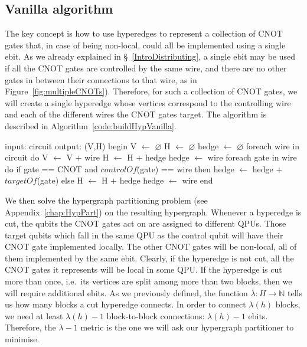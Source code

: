 \subsection{Vanilla algorithm}

The key concept is how to use hyperedges to represent a collection of CNOT gates that, in case of being non-local, could all be implemented using a single ebit. As we already explained in \S~\ref{IntroDistributing}, a single ebit may be used if all the CNOT gates are controlled by the same wire, and there are no other gates in between their connections to that wire, as in Figure~\ref{fig:multipleCNOTs}). Therefore, for such a collection of CNOT gates, we will create a single hyperedge whose vertices correspond to the controlling wire and each of the different wires the CNOT gates target. The algorithm is described in Algorithm~\ref{code:buildHypVanilla}.

\begin{algorithm}[caption={Builds the hypergraph of a given circuit. \(H\) may contain multiple hyperedges connecting the same vertices.}, label={code:buildHypVanilla}]
input: circuit
output: (V,H)
begin
  V $\gets$ $\varnothing$
  H $\gets$ $\varnothing$
  hedge $\gets$ $\varnothing$
  foreach wire in circuit do
    V $\gets$ V $+$ {wire}
    H $\gets$ H $+$ {hedge}
    hedge $\gets$ {wire}
    foreach gate in wire do
      if gate == CNOT and $controlOf$(gate) == wire then
        hedge $\gets$ hedge $+$ {$targetOf$(gate)}
      else
        H $\gets$ H $+$ {hedge}
        hedge $\gets$ {wire}
end
\end{algorithm}

We then solve the hypergraph partitioning problem (see Appendix~\ref{chap:HypPart}) on the resulting hypergraph. Whenever a hyperedge is cut, the qubits the CNOT gates act on are assigned to different QPUs. Those target qubits which fall in the same QPU as the control qubit will have their CNOT gate implemented locally. The other CNOT gates will be non-local, all of them implemented by the same ebit. Clearly, if the hyperedge is not cut, all the CNOT gates it represents will be local in some QPU. If the hyperedge is cut more than once, i.e.\ its vertices are split among more than two blocks, then we will require additional ebits. As we previously defined, the function \(\lambda\colon H \to \mathbb{N}\) tells us how many blocks a cut hyperedge connects. In order to connect \(\lambda(h)\) blocks, we need at least \(\lambda(h)-1\) block-to-block connections: \(\lambda(h)-1\) ebits. Therefore, the \(\lambda-1\) metric is the one we will ask our hypergraph partitioner to minimise.

